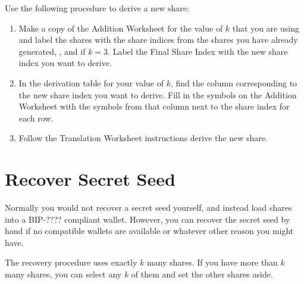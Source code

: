 \documentclass{article}
\newcommand{\tmverbatim}[1]{{\ttfamily{#1}}}
\newenvironment{enumeratenumeric}{\begin{enumerate}[1.] }{\end{enumerate}}
\begin{document}
Use the following procedure to derive a new share:
\begin{enumeratenumeric}
  \item Make a copy of the Addition Worksheet for the value of $k$ that you
  are using and label the shares with the share indices from the shares you
  have already generated, \tmverbatim{A}, \tmverbatim{C} and \tmverbatim{D} if
  $k = 3$. Label the Final Share Index with the new share index you want to
  derive.
  
  \item In the derivation table for your value of $k$, find the column
  corresponding to the new share index you want to derive. Fill in the symbols
  on the Addition Worksheet with the symbols from that column next to the
  share index for each row.
  
  \item Follow the Translation Worksheet instructions derive the new share.
\end{enumeratenumeric}
\section{Recover Secret Seed}\label{RecoverSecret}

Normally you would not recover a secret seed yourself, and instead load shares
into a BIP-???? compliant wallet. However, you can recover the secret seed by
hand if no compatible wallets are available or whatever other reason you might
have.

The recovery procedure uses exactly $k$ many shares. If you have more than $k$
many shares, you can select any $k$ of them and set the other shares aside.
\end{document}
